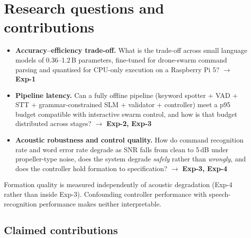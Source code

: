 \documentclass[11pt,a4paper]{article}
\newcommand{\munit}[1]{\,#1}
\begin{document}
\section{Research questions and contributions}
\label{sec:rq}

\begin{itemize}[leftmargin=1.8em,itemsep=4pt]
  \item[\textbf{RQ1}] \textbf{Accuracy--efficiency trade-off.} What is the trade-off across small language
        models of 0.36--1.2\munit{B} parameters, fine-tuned for drone-swarm command parsing and quantised
        for CPU-only execution on a Raspberry Pi 5? $\rightarrow$ \textbf{Exp-1}
  \item[\textbf{RQ2}] \textbf{Pipeline latency.} Can a fully offline pipeline (keyword spotter + VAD + STT
        + grammar-constrained SLM + validator + controller) meet a p95 budget compatible with interactive
        swarm control, and how is that budget distributed across stages? $\rightarrow$ \textbf{Exp-2,
        Exp-3}
  \item[\textbf{RQ3}] \textbf{Acoustic robustness and control quality.} How do command recognition rate
        and word error rate degrade as SNR falls from clean to 5\munit{dB} under propeller-type noise, does
        the system degrade \emph{safely} rather than \emph{wrongly}, and does the controller hold formation
        to specification? $\rightarrow$ \textbf{Exp-3, Exp-4}
\end{itemize}

Formation quality is measured independently of acoustic degradation (Exp-4 rather than inside Exp-3).
Confounding controller performance with speech-recognition performance makes neither interpretable.

\subsection{Claimed contributions}
\end{document}
